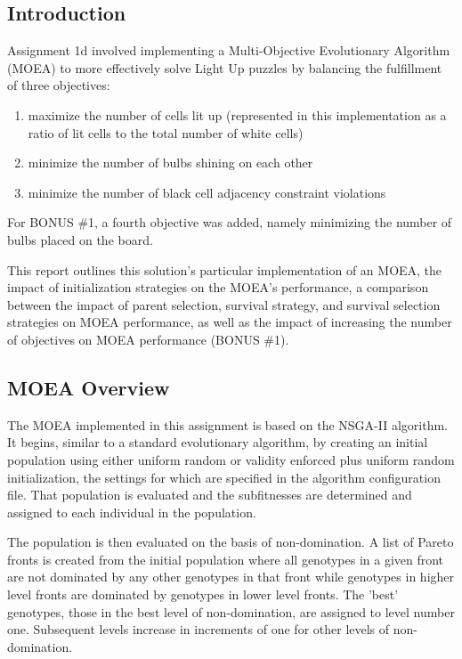 \documentclass[11pt]{article}
\begin{document}
\subsection{Introduction}

Assignment 1d involved implementing a Multi-Objective Evolutionary Algorithm (MOEA)
to more effectively solve Light Up puzzles by balancing the fulfillment of three
objectives: 

\begin{enumerate}

    \item maximize the number of cells lit up (represented in this implementation
    as a ratio of lit cells to the total number of white cells)

    \item minimize the number of bulbs shining on each other

    \item minimize the number of black cell adjacency constraint violations

\end{enumerate}

For BONUS \#1, a fourth objective was added, namely minimizing the number of bulbs
placed on the board.

This report outlines this solution's particular
implementation of an MOEA, the impact of initialization strategies on the MOEA's 
performance, a comparison between the impact of parent selection, survival strategy, and survival
selection strategies on MOEA performance, as well as the impact of increasing the
number of objectives on MOEA performance (BONUS \#1).


\subsection{MOEA Overview}

The MOEA implemented in this assignment is based on the NSGA-II algorithm. It begins,
similar to a standard evolutionary algorithm, by creating an initial population using
either uniform random or validity enforced plus uniform random initialization, the 
settings for which are specified in the algorithm configuration file. That population
is evaluated and the subfitnesses are determined and assigned to each individual 
in the population.

The population is then evaluated on the basis of non-domination. A list of Pareto fronts is created
from the initial population where all genotypes in a given front are not dominated
by any other genotypes in that front while genotypes in higher level fronts are dominated
by genotypes in lower level fronts. The 'best' genotypes, those in the best level
of non-domination, are assigned to level number one. Subsequent levels increase in
increments of one for other levels of non-domination.
\end{document}
